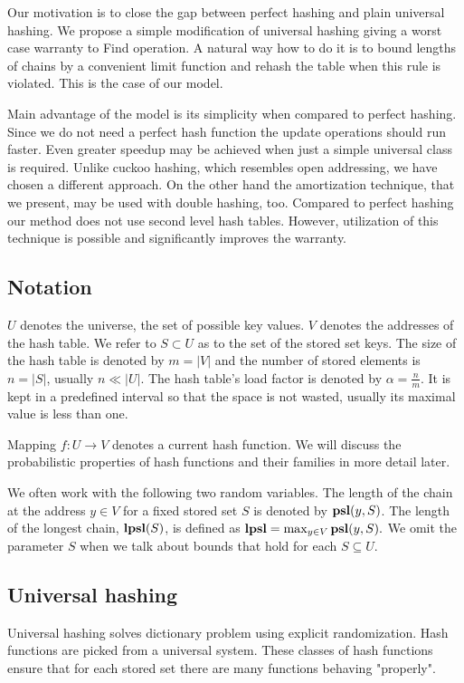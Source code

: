 Our motivation is to close the gap between perfect hashing and plain universal hashing. We propose a simple modification of universal hashing giving a worst case warranty to Find operation. A natural way how to do it is to bound lengths of chains by a convenient limit function and rehash the table when this rule is violated. This is the case of our model.

Main advantage of the model is its simplicity when compared to perfect hashing. Since we do not need a perfect hash function the update operations should run faster. Even greater speedup may be achieved when just a simple universal class is required. Unlike cuckoo hashing, which resembles open addressing, we have chosen a different approach. On the other hand the amortization technique, that we present, may be used with double hashing, too. Compared to perfect hashing our method does not use second level hash tables. However, utilization of this technique is possible and significantly improves the warranty.

\subsection{Notation}
$U$ denotes the universe, the set of possible key values. $V$ denotes the addresses of the hash table. We refer to $S \subset U$ as to the set of the stored set keys. The size of the hash table is denoted by $m = |V|$ and the number of stored elements is $n = |S|$, usually $n \ll |U|$. The hash table's load factor is denoted by $\alpha = \frac{n}{m}$. It is kept in a predefined interval so that the space is not wasted, usually its maximal value is less than one.

Mapping $f\colon U \rightarrow V$ denotes a current hash function. We will discuss the probabilistic properties of hash functions and their families in more detail later.

We often work with the following two random variables. The length of the chain at the address $y \in V$ for a fixed stored set $S$ is denoted by $\mathbf{psl}(y, S)$. The length of the longest chain, $\mathbf{lpsl}(S)$, is defined as $\mathbf{lpsl} = \max_{y \in V} \mathbf{psl}(y, S).$ We omit the parameter $S$ when we talk about bounds that hold for each $S \subseteq U$.

\subsection{Universal hashing}
Universal hashing solves dictionary problem using explicit randomization. Hash functions are picked from a universal system. These classes of hash functions ensure that for each stored set there are many functions behaving "properly".

